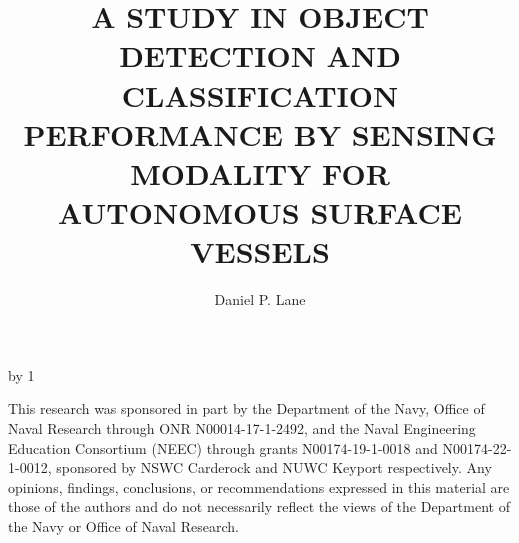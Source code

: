 \documentclass{erauthesis}
\title{A STUDY IN OBJECT DETECTION AND CLASSIFICATION
PERFORMANCE BY SENSING MODALITY FOR AUTONOMOUS
SURFACE VESSELS} %
\author{Daniel P. Lane}
\begin{document}
\frontmatter

\maketitle

\makeatletter 
\advance\fau@frontstage by 1  %

\begin{acknowledgements}

    \raggedright This research was sponsored in part by the Department of the Navy, Office of Naval Research through ONR N00014-17-1-2492, and the Naval Engineering Education Consortium (NEEC) through grants N00174-19-1-0018 and N00174-22-1-0012, sponsored by NSWC Carderock and NUWC Keyport respectively. Any opinions, findings, conclusions, or recommendations expressed in this material are those of the authors and do not necessarily reflect the views of the Department of the Navy or Office of Naval Research.
\end{acknowledgements}
\end{document}
